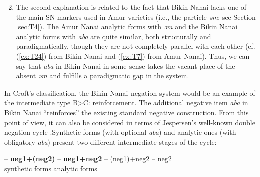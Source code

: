 \documentclass[output=paper]{langscibook}
\begin{document}
\begin{enumerate}
    \setcounter{enumi}{1}
    \item The second explanation is related to the fact that Bikin Nanai lacks one of the main SN-markers used in Amur varieties (i.e., the particle \textit{əm}; see Section \ref{sec:T4}). The Amur Nanai analytic forms with \textit{əm} and the Bikin Nanai analytic forms with \textit{aba} are quite similar, both structurally and paradigmatically, though they are not completely parallel with each other (cf. (\ref{ex:T24}) from Bikin Nanai and (\ref{ex:T7}) from Amur Nanai). Thus, we can say that \textit{aba} in Bikin Nanai in some sense takes the vacant place of the absent \textit{əm} and fulfills a paradigmatic gap in the system.
\end{enumerate}

In Croft’s \citeyearpar{Croft1991} classification, the Bikin Nanai negation system would be an example of the intermediate type B>C: reinforcement. The additional negative item \textit{aba} in Bikin Nanai “reinforces” the existing standard negative construction. From this point of view, it can also be considered in terms of Jespersen’s well-known double negation cycle \citep{Jespersen1917, Auwera2009, Auwera2010}.\footnotemark Synthetic forms (with optional \textit{aba}) and analytic ones (with obligatory \textit{aba}) present two different intermediate stages of the cycle:


\begin{exe}
     {–} \textbf{neg1+(neg2)} – \textbf{neg1+neg2} – (neg1)+neg2 – neg2\\
    { } { } {synthetic forms} {} {analytic forms}
\end{exe}
\end{document}
